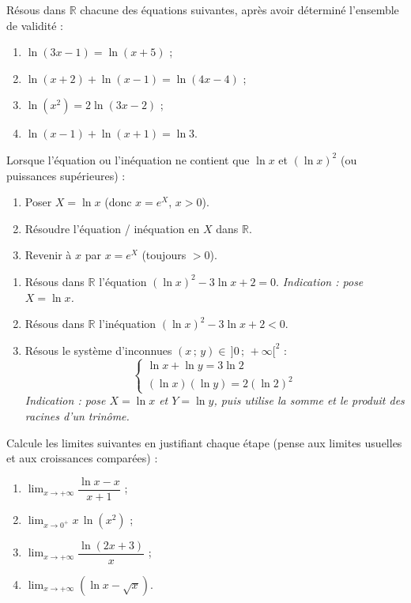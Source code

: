 \documentclass[11pt]{article}
\begin{document}
\begin{exercice}
Résous dans $\mathbb{R}$ chacune des équations suivantes, après avoir déterminé l'ensemble de validité :
\begin{enumerate}
\item $\ln(3x - 1) = \ln(x + 5)$ ;
\item $\ln(x+2) + \ln(x-1) = \ln(4x - 4)$ ;
\item $\ln(x^2) = 2\ln(3x - 2)$ ;
\item $\ln(x-1) + \ln(x+1) = \ln 3$.
\end{enumerate}
\end{exercice}

\begin{methode}[Inconnue auxiliaire $X = \ln x$]
Lorsque l'équation ou l'inéquation ne contient que $\ln x$ et $(\ln x)^2$ (ou puissances supérieures) :
\begin{enumerate}
\item Poser $X = \ln x$ (donc $x = e^X$, $x>0$).
\item Résoudre l'équation / inéquation en $X$ dans $\mathbb{R}$.
\item Revenir à $x$ par $x = e^X$ (toujours $>0$).
\end{enumerate}
\end{methode}

\begin{exercice}[Inconnue auxiliaire $X = \ln x$]
\begin{enumerate}
\item Résous dans $\mathbb{R}$ l'équation $(\ln x)^2 - 3\ln x + 2 = 0$. \emph{Indication : pose $X = \ln x$.}
\item Résous dans $\mathbb{R}$ l'inéquation $(\ln x)^2 - 3\ln x + 2 < 0$.
\item Résous le système d'inconnues $(x\,;\,y) \in \,]0\,;\,+\infty[^2$ :
\[
\begin{cases}
\ln x + \ln y = 3\ln 2 \\
(\ln x)(\ln y) = 2(\ln 2)^2
\end{cases}
\]
\emph{Indication : pose $X = \ln x$ et $Y = \ln y$, puis utilise la somme et le produit des racines d'un trinôme.}
\end{enumerate}
\end{exercice}

\begin{exercice}
Calcule les limites suivantes en justifiant chaque étape (pense aux limites usuelles et aux croissances comparées) :
\begin{enumerate}
\item $\displaystyle\lim_{x \to +\infty} \dfrac{\ln x - x}{x + 1}$ ;
\item $\displaystyle\lim_{x \to 0^+} x\,\ln(x^2)$ ;
\item $\displaystyle\lim_{x \to +\infty} \dfrac{\ln(2x+3)}{x}$ ;
\item $\displaystyle\lim_{x \to +\infty} \left(\ln x - \sqrt{x}\right)$.
\end{enumerate}
\end{exercice}
\end{document}
